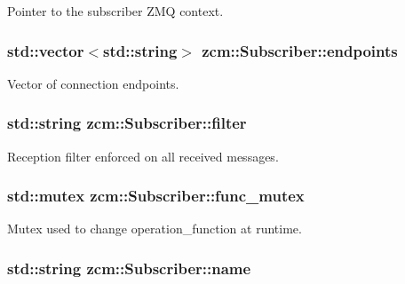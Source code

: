 Pointer to the subscriber Z\+MQ context. 

\subsubsection[{\texorpdfstring{endpoints}{endpoints}}]{\setlength{\rightskip}{0pt plus 5cm}std\+::vector$<$std\+::string$>$ zcm\+::\+Subscriber\+::endpoints\hspace{0.3cm}{\ttfamily [private]}}\hypertarget{classzcm_1_1Subscriber_a81590d7017038d6f50073baaa485a1b7}{}\label{classzcm_1_1Subscriber_a81590d7017038d6f50073baaa485a1b7}


Vector of connection endpoints. 

\subsubsection[{\texorpdfstring{filter}{filter}}]{\setlength{\rightskip}{0pt plus 5cm}std\+::string zcm\+::\+Subscriber\+::filter\hspace{0.3cm}{\ttfamily [private]}}\hypertarget{classzcm_1_1Subscriber_a28ab0921d97bc4d05ac6bb64c977cc35}{}\label{classzcm_1_1Subscriber_a28ab0921d97bc4d05ac6bb64c977cc35}


Reception filter enforced on all received messages. 

\subsubsection[{\texorpdfstring{func\+\_\+mutex}{func_mutex}}]{\setlength{\rightskip}{0pt plus 5cm}std\+::mutex zcm\+::\+Subscriber\+::func\+\_\+mutex\hspace{0.3cm}{\ttfamily [private]}}\hypertarget{classzcm_1_1Subscriber_abd7e5c8f6ab6ce6e8854d8d407476c25}{}\label{classzcm_1_1Subscriber_abd7e5c8f6ab6ce6e8854d8d407476c25}


Mutex used to change operation\+\_\+function at runtime. 

\subsubsection[{\texorpdfstring{name}{name}}]{\setlength{\rightskip}{0pt plus 5cm}std\+::string zcm\+::\+Subscriber\+::name\hspace{0.3cm}{\ttfamily [private]}}\hypertarget{classzcm_1_1Subscriber_a2ec3b22204d0f3f72e996b19b086910b}{}\label{classzcm_1_1Subscriber_a2ec3b22204d0f3f72e996b19b086910b}


